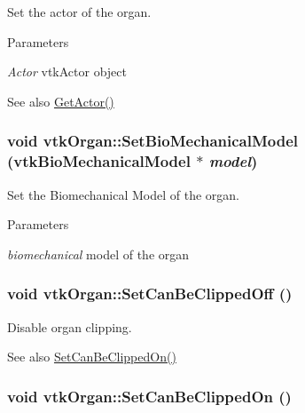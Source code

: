 Set the actor of the organ. 
\begin{DoxyParams}{Parameters}
\item[{\em Actor}]vtkActor object \end{DoxyParams}
\begin{DoxySeeAlso}{See also}
\hyperlink{classvtkOrgan_af12bcf578df2448068251a80b08822c1}{GetActor()} 
\end{DoxySeeAlso}
\hypertarget{classvtkOrgan_ad163fb8b19cb52cf99eb350512945510}{
\subsubsection[{SetBioMechanicalModel}]{\setlength{\rightskip}{0pt plus 5cm}void vtkOrgan::SetBioMechanicalModel ({\bf vtkBioMechanicalModel} $\ast$ {\em model})}}
\label{classvtkOrgan_ad163fb8b19cb52cf99eb350512945510}


Set the Biomechanical Model of the organ. 
\begin{DoxyParams}{Parameters}
\item[{\em biomechanical}]model of the organ \end{DoxyParams}
\hypertarget{classvtkOrgan_a6faee69d6495879b5f545bf1446dd304}{
\subsubsection[{SetCanBeClippedOff}]{\setlength{\rightskip}{0pt plus 5cm}void vtkOrgan::SetCanBeClippedOff ()}}
\label{classvtkOrgan_a6faee69d6495879b5f545bf1446dd304}


Disable organ clipping. \begin{DoxySeeAlso}{See also}
\hyperlink{classvtkOrgan_a65da602da9636309dcfa094b537a9fef}{SetCanBeClippedOn()} 
\end{DoxySeeAlso}
\hypertarget{classvtkOrgan_a65da602da9636309dcfa094b537a9fef}{
\subsubsection[{SetCanBeClippedOn}]{\setlength{\rightskip}{0pt plus 5cm}void vtkOrgan::SetCanBeClippedOn ()}}
\label{classvtkOrgan_a65da602da9636309dcfa094b537a9fef}


